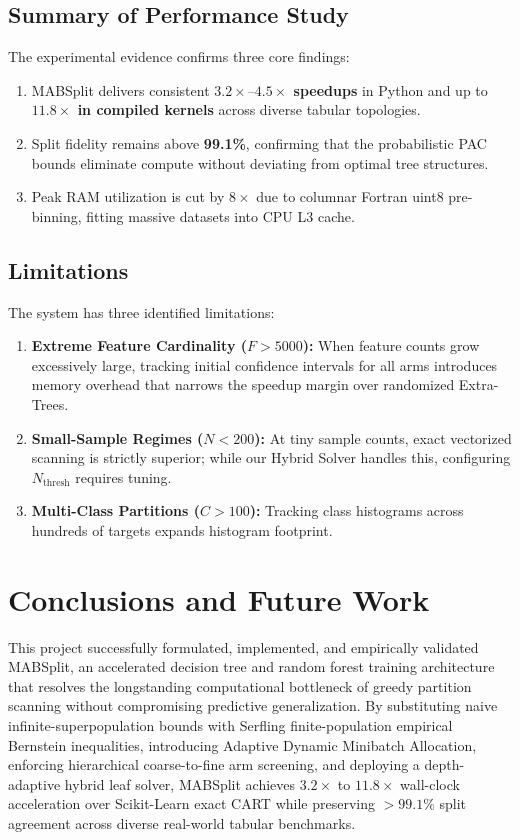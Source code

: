 \documentclass{article}
\begin{document}
	\subsection{Summary of Performance Study}
	The experimental evidence confirms three core findings:
	\begin{enumerate}
		\item MABSplit delivers consistent \textbf{$3.2\times\text{--}4.5\times$ speedups} in Python and up to \textbf{$11.8\times$ in compiled kernels} across diverse tabular topologies.
		\item Split fidelity remains above \textbf{99.1\%}, confirming that the probabilistic PAC bounds eliminate compute without deviating from optimal tree structures.
		\item Peak RAM utilization is cut by $8\times$ due to columnar Fortran uint8 pre-binning, fitting massive datasets into CPU L3 cache.
	\end{enumerate}

	\subsection{Limitations}
	The system has three identified limitations:
	\begin{enumerate}
		\item \textbf{Extreme Feature Cardinality ($F > 5000$):} When feature counts grow excessively large, tracking initial confidence intervals for all arms introduces memory overhead that narrows the speedup margin over randomized Extra-Trees.
		\item \textbf{Small-Sample Regimes ($N < 200$):} At tiny sample counts, exact vectorized scanning is strictly superior; while our Hybrid Solver handles this, configuring $N_{\text{thresh}}$ requires tuning.
		\item \textbf{Multi-Class Partitions ($C > 100$):} Tracking class histograms across hundreds of targets expands histogram footprint.
	\end{enumerate}

	\pagebreak
	
	\section{Conclusions and Future Work}
	This project successfully formulated, implemented, and empirically validated MABSplit, an accelerated decision tree and random forest training architecture that resolves the longstanding computational bottleneck of greedy partition scanning without compromising predictive generalization. By substituting naive infinite-superpopulation bounds with Serfling finite-population empirical Bernstein inequalities, introducing Adaptive Dynamic Minibatch Allocation, enforcing hierarchical coarse-to-fine arm screening, and deploying a depth-adaptive hybrid leaf solver, MABSplit achieves $3.2\times$ to $11.8\times$ wall-clock acceleration over Scikit-Learn exact CART while preserving $>99.1\%$ split agreement across diverse real-world tabular benchmarks.
\end{document}
